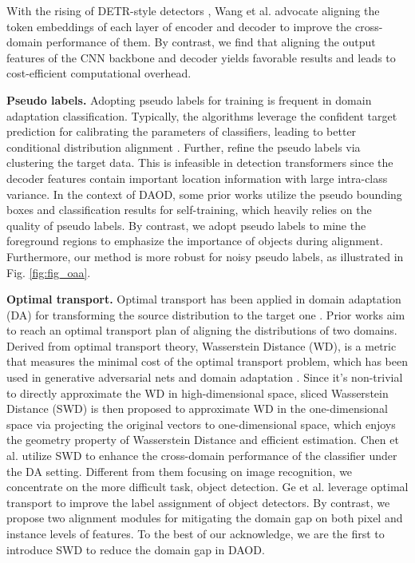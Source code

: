 \documentclass[sigconf]{acmart}
\begin{document}
With the rising of DETR-style detectors \cite{detr,zhu2020deformable}, Wang et al. \cite{wang2021exploring} advocate aligning the token embeddings of each layer of encoder and decoder to improve the cross-domain performance of them. 
By contrast, we find that aligning the output features of the CNN backbone and decoder yields favorable results and leads to cost-efficient computational overhead.

\textbf{Pseudo labels.}
Adopting pseudo labels for training is frequent in domain adaptation classification. Typically, the algorithms leverage the confident target prediction for calibrating the parameters of classifiers, leading to better conditional distribution alignment \cite{CBST,MSTN}. Further, \cite{SHOT,liang2021domain} refine the pseudo labels via clustering the target data. This is infeasible in detection transformers since the decoder features contain important location information with large intra-class variance. In the context of DAOD, some prior works \cite{kim2019self,jiang2021decoupled} utilize the pseudo bounding boxes and classification results for self-training, which heavily relies on the quality of pseudo labels. By contrast, we adopt pseudo labels to mine the foreground regions to emphasize the importance of objects during alignment. Furthermore, our method is more robust for noisy pseudo labels, as illustrated in Fig. \ref{fig:fig_oaa}.

\textbf{Optimal transport.} 
Optimal transport has been applied in domain adaptation (DA) for transforming the source distribution to the target one \cite{flamary2016optimal,jdot,deepjtot}. Prior works \cite{flamary2016optimal,jdot,deepjtot} aim to reach an optimal transport plan of aligning the distributions of two domains. Derived from optimal transport theory, Wasserstein Distance (WD), is a metric that measures the minimal cost of the optimal transport problem, which has been used in generative adversarial nets \cite{WGAN} and domain adaptation \cite{shen2018wasserstein}. Since it's non-trivial to directly approximate the WD in high-dimensional space, sliced Wasserstein Distance (SWD) \cite{Wasserstein} is then proposed to approximate WD in the one-dimensional space via projecting the original vectors to one-dimensional space, which enjoys the geometry property of Wasserstein Distance and efficient estimation. Chen et al. \cite{lee2019sliced} utilize SWD to enhance the cross-domain performance of the classifier under the DA setting. Different from them focusing on image recognition, we concentrate on the more difficult task, object detection. Ge et al. \cite{ge2021ota} leverage optimal transport to improve the label assignment of object detectors. By contrast, we propose two alignment modules for mitigating the domain gap on both pixel and instance levels of features. To the best of our acknowledge, we are the first to introduce SWD to reduce the domain gap in DAOD. 
\end{document}

